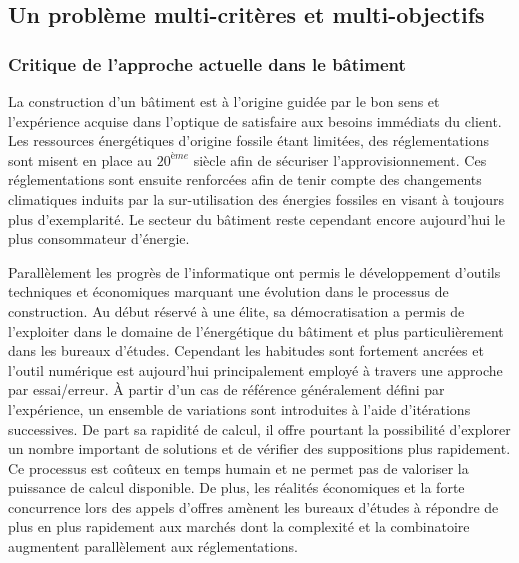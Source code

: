 


\subsection{Un problème multi-critères et multi-objectifs} %
\label{sub:un_probleme_multi_criteres_et_multi_objectifs}
\subsubsection{Critique de l’approche actuelle dans le bâtiment} %
\label{ssub:critique_de_l_approche_actuelle_dans_le_batiment}
La construction d’un bâtiment est à l’origine guidée par le bon sens et l’expérience
acquise dans l’optique de satisfaire aux besoins immédiats du client.
Les ressources énergétiques d’origine fossile étant limitées, des
réglementations sont misent en place au $20^{ème}$ siècle afin de sécuriser
l’approvisionnement. Ces réglementations sont ensuite renforcées afin de tenir
compte des changements climatiques induits par la sur-utilisation des énergies
fossiles en visant à toujours plus d’exemplarité. Le secteur du bâtiment reste
cependant encore aujourd’hui le plus consommateur d’énergie.

Parallèlement les progrès de l’informatique ont permis le développement d’outils
techniques et économiques marquant une évolution dans le processus de construction. Au
début réservé à une élite, sa démocratisation a permis de l’exploiter dans le domaine de
l’énergétique du bâtiment et plus particulièrement dans les bureaux d’études. Cependant
les habitudes sont fortement ancrées et l’outil numérique est aujourd’hui principalement
employé à travers une approche par essai/erreur. À partir d’un cas de référence
généralement défini par l’expérience, un ensemble de variations sont introduites à l’aide
d’itérations successives. De part sa rapidité de calcul, il offre pourtant la possibilité
d’explorer un nombre important de solutions et de vérifier des suppositions plus
rapidement. Ce processus est coûteux en temps humain et ne permet pas de valoriser la
puissance de calcul disponible. De plus, les réalités économiques et la forte concurrence
lors des appels d’offres amènent les bureaux d’études à répondre de plus en plus
rapidement aux marchés dont la complexité et la combinatoire augmentent parallèlement aux
réglementations.

